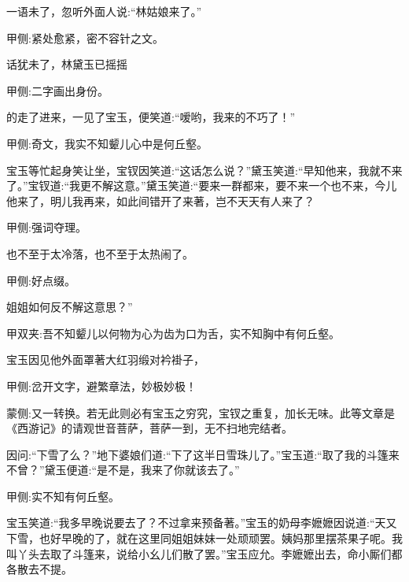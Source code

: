 \begin{parag}
    一语未了，忽听外面人说:“林姑娘来了。”\begin{note}甲侧:紧处愈紧，密不容针之文。\end{note}话犹未了，林黛玉已摇摇\begin{note}甲侧:二字画出身份。\end{note}的走了进来，一见了宝玉，便笑道:“嗳哟，我来的不巧了！”\begin{note}甲侧:奇文，我实不知颦儿心中是何丘壑。\end{note}宝玉等忙起身笑让坐，宝钗因笑道:“这话怎么说？”黛玉笑道:“早知他来，我就不来了。”宝钗道:“我更不解这意。”黛玉笑道:“要来一群都来，要不来一个也不来，今儿他来了，明儿我再来，如此间错开了来著，岂不天天有人来了？\begin{note}甲侧:强词夺理。\end{note}也不至于太冷落，也不至于太热闹了。\begin{note}甲侧:好点缀。\end{note}姐姐如何反不解这意思？”\begin{note}甲双夹:吾不知颦儿以何物为心为齿为口为舌，实不知胸中有何丘壑。\end{note}
\end{parag}


\begin{parag}
    宝玉因见他外面罩著大红羽缎对衿褂子，\begin{note}甲侧:岔开文字，避繁章法，妙极妙极！\end{note}\begin{note}蒙侧:又一转换。若无此则必有宝玉之穷究，宝钗之重复，加长无味。此等文章是《西游记》的请观世音菩萨，菩萨一到，无不扫地完结者。\end{note}因问:“下雪了么？”地下婆娘们道:“下了这半日雪珠儿了。”宝玉道:“取了我的斗篷来不曾？”黛玉便道:“是不是，我来了你就该去了。”\begin{note}甲侧:实不知有何丘壑。\end{note}宝玉笑道:“我多早晚说要去了？不过拿来预备著。”宝玉的奶母李嬷嬷因说道:“天又下雪，也好早晚的了，就在这里同姐姐妹妹一处顽顽罢。姨妈那里摆茶果子呢。我叫丫头去取了斗篷来，说给小幺儿们散了罢。”宝玉应允。李嬷嬷出去，命小厮们都各散去不提。
\end{parag}


